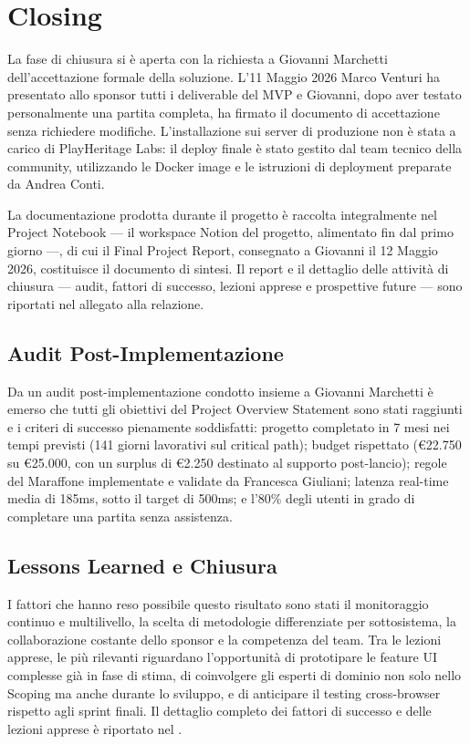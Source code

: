 \chapter{Closing}

La fase di chiusura si è aperta con la richiesta a Giovanni Marchetti dell'accettazione formale della soluzione. L'11 Maggio 2026 Marco Venturi ha presentato allo sponsor tutti i deliverable del MVP e Giovanni, dopo aver testato personalmente una partita completa, ha firmato il documento di accettazione senza richiedere modifiche. L'installazione sui server di produzione non è stata a carico di PlayHeritage Labs: il deploy finale è stato gestito dal team tecnico della community, utilizzando le Docker image e le istruzioni di deployment preparate da Andrea Conti.

La documentazione prodotta durante il progetto è raccolta integralmente nel Project Notebook --- il workspace Notion del progetto, alimentato fin dal primo giorno ---, di cui il Final Project Report, consegnato a Giovanni il 12 Maggio 2026, costituisce il documento di sintesi. Il report e il dettaglio delle attività di chiusura --- audit, fattori di successo, lezioni apprese e prospettive future --- sono riportati nel  allegato alla relazione.

\section{Audit Post-Implementazione}

Da un audit post-implementazione condotto insieme a Giovanni Marchetti è emerso che tutti gli obiettivi del Project Overview Statement sono stati raggiunti e i criteri di successo pienamente soddisfatti: progetto completato in 7 mesi nei tempi previsti (141 giorni lavorativi sul critical path); budget rispettato (€22.750 su €25.000, con un surplus di €2.250 destinato al supporto post-lancio); regole del Maraffone implementate e validate da Francesca Giuliani; latenza real-time media di 185ms, sotto il target di 500ms; e l'80\% degli utenti in grado di completare una partita senza assistenza.

\section{Lessons Learned e Chiusura}

I fattori che hanno reso possibile questo risultato sono stati il monitoraggio continuo e multilivello, la scelta di metodologie differenziate per sottosistema, la collaborazione costante dello sponsor e la competenza del team. Tra le lezioni apprese, le più rilevanti riguardano l'opportunità di prototipare le feature UI complesse già in fase di stima, di coinvolgere gli esperti di dominio non solo nello Scoping ma anche durante lo sviluppo, e di anticipare il testing cross-browser rispetto agli sprint finali. Il dettaglio completo dei fattori di successo e delle lezioni apprese è riportato nel .

